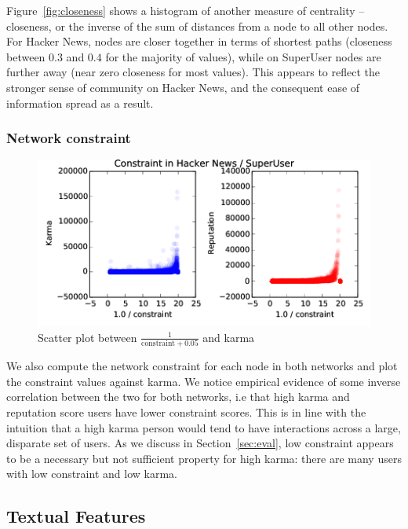 \documentclass[11pt]{article}
\begin{document}
Figure~\ref{fig:closeness} shows a histogram of another measure of centrality --
closeness, or the inverse of the sum of distances from a node to all other
nodes. For Hacker News, nodes are closer together in terms of shortest paths 
(closeness between $0.3$ and $0.4$ for the majority of values), while on SuperUser nodes
are further away (near zero closeness for most values). This appears to reflect
the stronger sense of community on Hacker News, and the consequent ease of
information spread as a result.

\subsubsection{Network constraint}
\label{sec:constraint}

\begin{figure}[h]
\centering
\includegraphics[width=\linewidth]{constraint_correlation-png}
\caption{Scatter plot between $\frac{1}{\text{constraint} + 0.05}$ and karma}
\end{figure}

We also compute the network constraint for each node in both networks and plot
the constraint values against karma. We notice empirical evidence of some 
inverse correlation between the two for both networks, i.e that high karma and
reputation score users have lower constraint scores. This is in line with the
intuition that a high karma person would tend to have interactions across a
large, disparate set of users. As we discuss in Section~\ref{sec:eval}, low constraint
appears to be a necessary but not sufficient property for high karma: there are
many users with low constraint and low karma.

\subsection{Textual Features}
\end{document}
